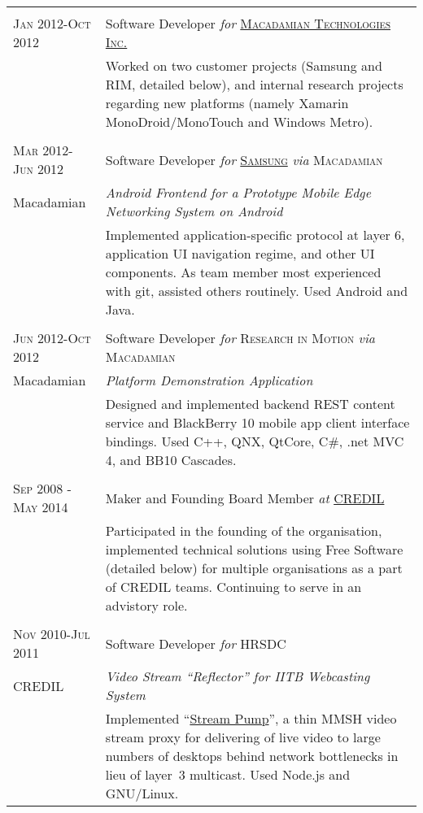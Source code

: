 \documentclass[letterpaper,10pt]{article}
\begin{document}
\begin{longtable}{p{3cm}|p{12cm}}
\multicolumn{2}{c}{} \\
  \textsc{Jan 2012-Oct 2012} & Software Developer \emph{for} \href{http://www.macadamian.com/}{\textsc{Macadamian Technologies Inc.}} \\
   & \footnotesize{Worked on two customer projects (Samsung and RIM, detailed below), and internal research projects regarding new platforms (namely Xamarin MonoDroid/MonoTouch and Windows Metro).} \\
\multicolumn{2}{c}{} \\
  \textsc{Mar 2012-Jun 2012} & Software Developer \emph{for} \href{http://www.sisa.samsung.com/}{\textsc{Samsung}} \emph{via} \textsc{Macadamian} \\
  \tiny{Macadamian} & \emph{Android Frontend for a Prototype Mobile Edge Networking System on Android} \\
   & \footnotesize{Implemented application-specific protocol at layer 6, application UI navigation regime, and other UI components.  As team member most experienced with git, assisted others routinely.  Used Android and Java.} \\
\multicolumn{2}{c}{} \\
  \textsc{Jun 2012-Oct 2012} & Software Developer \emph{for} \textsc{Research in Motion} \emph{via} \textsc{Macadamian} \\
  \tiny{Macadamian} & \emph{Platform Demonstration Application} \\
   & \footnotesize{Designed and implemented backend REST content service and BlackBerry 10 mobile app client interface bindings.  Used C++, QNX, QtCore, C\#, .net MVC 4, and BB10 Cascades.} \\
\multicolumn{2}{c}{} \\
  \textsc{Sep 2008 - May 2014} & Maker and Founding Board Member \emph{at} \href{http://credil.org/}{\textsc{CREDIL}} \\
   & \footnotesize{Participated in the founding of the organisation, implemented technical solutions using Free Software (detailed below) for multiple organisations as a part of CREDIL teams.  Continuing to serve in an advistory role.} \\
\multicolumn{2}{c}{} \\
  \textsc{Nov 2010-Jul 2011} & Software Developer \emph{for} \textsc{HRSDC} \\
  \tiny{CREDIL} & \emph{Video Stream ``Reflector'' for IITB Webcasting System} \\
   & \footnotesize{Implemented ``{\href{https://github.com/orospakr/stream-pump}{Stream Pump}}'', a thin MMSH video stream proxy for delivering of live video to large numbers of desktops behind network bottlenecks in lieu of \mbox{layer 3} \mbox{multicast}.  Used Node.js and GNU/Linux.} \\

\end{longtable}
\end{document}
